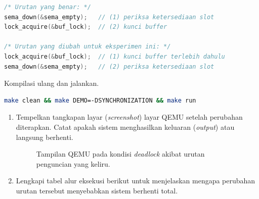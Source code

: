 \begin{enumerate}
	      \begin{lstlisting}[language=C, caption={Perbandingan urutan yang benar dan yang diubah}]
/* Urutan yang benar: */
sema_down(&sema_empty);   // (1) periksa ketersediaan slot
lock_acquire(&buf_lock);  // (2) kunci buffer

/* Urutan yang diubah untuk eksperimen ini: */
lock_acquire(&buf_lock);  // (1) kunci buffer terlebih dahulu
sema_down(&sema_empty);   // (2) periksa ketersediaan slot
    \end{lstlisting}

	      Kompilasi ulang dan jalankan.

	      \begin{lstlisting}[language=bash, caption={Kompilasi untuk eksperimen \textit{deadlock}}]
make clean && make DEMO=-DSYNCHRONIZATION && make run
    \end{lstlisting}

	      \begin{enumerate}
		      \item Tempelkan tangkapan layar (\textit{screenshot}) layar QEMU setelah perubahan diterapkan. Catat apakah sistem menghasilkan keluaran (\textit{output}) atau langsung berhenti.


		            \begin{figure}[H]
			            \centering
			            \caption{Tampilan QEMU pada kondisi \textit{deadlock} akibat urutan penguncian yang keliru.}
		            \end{figure}

		      \item Lengkapi tabel alur eksekusi berikut untuk menjelaskan mengapa perubahan urutan tersebut menyebabkan sistem berhenti total.


\end{enumerate}
\end{enumerate}
